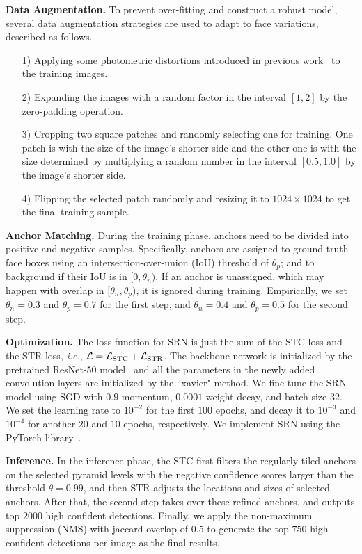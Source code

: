 \documentclass[letterpaper]{article} \usepackage{aaai19m}  \usepackage{times}  \usepackage{helvet}  \usepackage{courier}  \usepackage{url}  \usepackage{graphicx}  \usepackage{subfigure}
\def\ie{{\em i.e.}}
\begin{document}
{\flushleft \textbf{Data Augmentation.} }
To prevent over-fitting and construct a robust model, several data augmentation strategies are used to adapt to face variations, described as follows.
\begin{itemize}
\item[1)] Applying some photometric distortions introduced in previous work~\cite{DBLP:journals/corr/Howard13} to the training images.
\item[2)] Expanding the images with a random factor in the interval $[1,2]$ by the zero-padding operation.
\item[3)] Cropping two square patches and randomly selecting one for training. One patch is with the size of the image's shorter side and the other one is with the size determined by multiplying a random number in the interval $[0.5,1.0]$ by the image's shorter side.
\item[4)] Flipping the selected patch randomly and resizing it to $1024\times1024$ to get the final training sample.
\end{itemize}

{\noindent \textbf{Anchor Matching.} }
During the training phase, anchors need to be divided into positive and negative samples. Specifically, anchors are assigned to ground-truth face boxes using an intersection-over-union (IoU) threshold of $\theta_{p}$; and to background if their IoU is in $[0, \theta_{n})$. If an anchor is unassigned, which may happen with overlap in $[\theta_{n}, \theta_{p})$, it is ignored during training. Empirically, we set $\theta_{n}=0.3$ and $\theta_{p}=0.7$ for the first step, and $\theta_{n}=0.4$ and $\theta_{p}=0.5$ for the second step. 

{\flushleft \textbf{Optimization.} }
The loss function for SRN is just the sum of the STC loss and the STR loss, \ie, ${\cal L} = {\cal L}_\text{STC} + {\cal L}_\text{STR}$. The backbone network is initialized by the pretrained ResNet-50 model~\cite{DBLP:journals/ijcv/RussakovskyDSKS15} and all the parameters in the newly added convolution layers are initialized by the ``xavier" method. We fine-tune the SRN model using SGD with $0.9$ momentum, $0.0001$ weight decay, and batch size $32$. We set the learning rate to $10^{-2}$ for the first $100$ epochs, and decay it to $10^{-3}$ and $10^{-4}$ for another $20$ and $10$ epochs, respectively. We implement SRN using the PyTorch library~\cite{paszke2017pytorch}.

{\flushleft \textbf{Inference.} }
In the inference phase, the STC first filters  the regularly tiled anchors on the selected pyramid levels with the negative confidence scores larger than the threshold $\theta=0.99$, and then STR adjusts the locations and sizes of selected anchors. After that, the second step takes over these refined anchors, and outputs top $2000$ high confident detections. Finally, we apply the non-maximum suppression (NMS) with jaccard overlap of $0.5$ to generate the top $750$ high confident detections per image as the final results.
\end{document}
